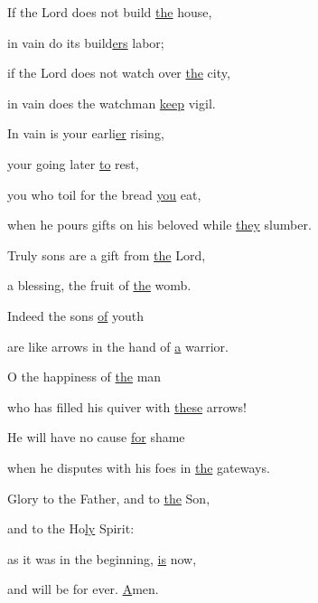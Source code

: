 \noindent If the Lord does not build \uline{the} house, ~\GreStar{}~\nopagebreak

in vain do its build\uline{ers} labor;

\noindent if the Lord does not watch over \uline{the} city, ~\GreStar{}~\nopagebreak

in vain does the watchman \uline{keep} vigil.

\noindent In vain is your earli\uline{er} rising, ~\GreStar{}~\nopagebreak

your going later \uline{to} rest,

\noindent you who toil for the bread \uline{you} eat, ~\GreStar{}~\nopagebreak

when he pours gifts on his beloved while \uline{they} slumber.

\noindent Truly sons are a gift from \uline{the} Lord, ~\GreStar{}~\nopagebreak

a blessing, the fruit of \uline{the} womb.

\noindent Indeed the sons \uline{of} youth ~\GreStar{}~\nopagebreak

are like arrows in the hand of \uline{a} warrior.

\noindent O the happiness of \uline{the} man ~\GreStar{}~\nopagebreak

who has filled his quiver with \uline{these} arrows!

\noindent He will have no cause \uline{for} shame ~\GreStar{}~\nopagebreak

when he disputes with his foes in \uline{the} gateways. 

\noindent Glory to the Father, and to \uline{the} Son,~\GreStar{}~\nopagebreak

and to the Ho\uline{ly} Spirit:

\noindent as it was in the beginning, \uline{is} now,~\GreStar{}~\nopagebreak

and will be for ever. \uline{A}men.
